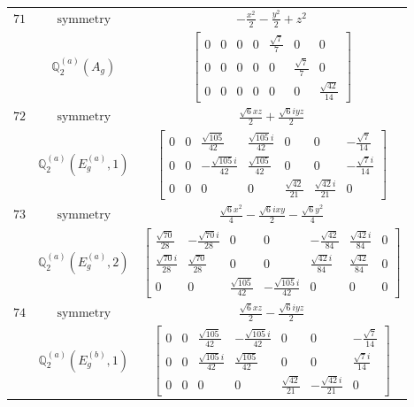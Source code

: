 \documentclass[fleqn,8pt,landscape]{jsarticle}
\begin{document}
\begin{longtable}{ccc}
$ 71 $ & $ \text{symmetry} $ & $ - \frac{x^{2}}{2} - \frac{y^{2}}{2} + z^{2} $ \\
$  $ & $ \mathbb{Q}_{2}^{(a)}(A_{g}) $ & $ \begin{bmatrix} 0 & 0 & 0 & 0 & \frac{\sqrt{7}}{7} & 0 & 0 \\ 0 & 0 & 0 & 0 & 0 & \frac{\sqrt{7}}{7} & 0 \\ 0 & 0 & 0 & 0 & 0 & 0 & \frac{\sqrt{42}}{14} \end{bmatrix} $ \\ \hline
$ 72 $ & $ \text{symmetry} $ & $ \frac{\sqrt{6} x z}{2} + \frac{\sqrt{6} i y z}{2} $ \\
$  $ & $ \mathbb{Q}_{2}^{(a)}(E_{g}^{(a)},1) $ & $ \begin{bmatrix} 0 & 0 & \frac{\sqrt{105}}{42} & \frac{\sqrt{105} i}{42} & 0 & 0 & - \frac{\sqrt{7}}{14} \\ 0 & 0 & - \frac{\sqrt{105} i}{42} & \frac{\sqrt{105}}{42} & 0 & 0 & - \frac{\sqrt{7} i}{14} \\ 0 & 0 & 0 & 0 & \frac{\sqrt{42}}{21} & \frac{\sqrt{42} i}{21} & 0 \end{bmatrix} $ \\ \hline
$ 73 $ & $ \text{symmetry} $ & $ \frac{\sqrt{6} x^{2}}{4} - \frac{\sqrt{6} i x y}{2} - \frac{\sqrt{6} y^{2}}{4} $ \\
$  $ & $ \mathbb{Q}_{2}^{(a)}(E_{g}^{(a)},2) $ & $ \begin{bmatrix} \frac{\sqrt{70}}{28} & - \frac{\sqrt{70} i}{28} & 0 & 0 & - \frac{\sqrt{42}}{84} & \frac{\sqrt{42} i}{84} & 0 \\ \frac{\sqrt{70} i}{28} & \frac{\sqrt{70}}{28} & 0 & 0 & \frac{\sqrt{42} i}{84} & \frac{\sqrt{42}}{84} & 0 \\ 0 & 0 & \frac{\sqrt{105}}{42} & - \frac{\sqrt{105} i}{42} & 0 & 0 & 0 \end{bmatrix} $ \\ \hline
$ 74 $ & $ \text{symmetry} $ & $ \frac{\sqrt{6} x z}{2} - \frac{\sqrt{6} i y z}{2} $ \\
$  $ & $ \mathbb{Q}_{2}^{(a)}(E_{g}^{(b)},1) $ & $ \begin{bmatrix} 0 & 0 & \frac{\sqrt{105}}{42} & - \frac{\sqrt{105} i}{42} & 0 & 0 & - \frac{\sqrt{7}}{14} \\ 0 & 0 & \frac{\sqrt{105} i}{42} & \frac{\sqrt{105}}{42} & 0 & 0 & \frac{\sqrt{7} i}{14} \\ 0 & 0 & 0 & 0 & \frac{\sqrt{42}}{21} & - \frac{\sqrt{42} i}{21} & 0 \end{bmatrix} $ \\ \hline

\end{longtable}
\end{document}
